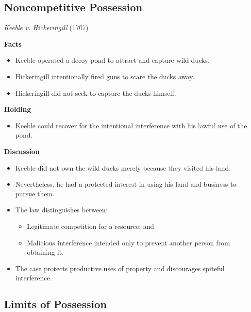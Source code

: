 \documentclass[11pt]{tex/lawoutline}
\begin{document}
\subsection{Noncompetitive Possession}

\casebox
{\textit{Keeble v. Hickeringill} (1707)}
{}
{
\textbf{Facts}
\begin{itemize}
    \item Keeble operated a decoy pond to attract and capture wild ducks.
    \item Hickeringill intentionally fired guns to scare the ducks away.
    \item Hickeringill did not seek to capture the ducks himself.
\end{itemize}

\textbf{Holding}
\begin{itemize}
    \item Keeble could recover for the intentional interference with his lawful use of the pond.
\end{itemize}

\textbf{Discussion}
\begin{itemize}
    \item Keeble did not own the wild ducks merely because they visited his land.
    \item Nevertheless, he had a protected interest in using his land and business to pursue them.
    \item The law distinguishes between:
    \begin{itemize}
        \item Legitimate competition for a resource; and
        \item Malicious interference intended only to prevent another person from obtaining it.
    \end{itemize}
    \item The case protects productive uses of property and discourages spiteful interference.
\end{itemize}
}


\subsection{Limits of Possession}
\end{document}
